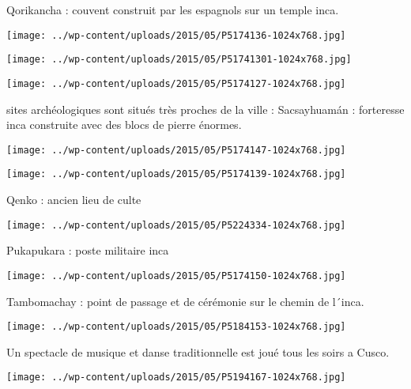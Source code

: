  Qorikancha : couvent construit par les espagnols sur un temple inca. \newline
 \newline
\centerline{\texttt{[image: ../wp-content/uploads/2015/05/P5174136-1024x768.jpg]} } 
 \newline
 \newline
\centerline{\texttt{[image: ../wp-content/uploads/2015/05/P51741301-1024x768.jpg]} } 
 \newline
 \newline
\centerline{\texttt{[image: ../wp-content/uploads/2015/05/P5174127-1024x768.jpg]} } 
  sites archéologiques sont situés très proches de la ville : \newline
 Sacsayhuamán : forteresse inca construite avec des blocs de pierre énormes. \newline
 \newline
\centerline{\texttt{[image: ../wp-content/uploads/2015/05/P5174147-1024x768.jpg]} } 
 \newline
 \newline
\centerline{\texttt{[image: ../wp-content/uploads/2015/05/P5174139-1024x768.jpg]} } 
 \newline
 Qenko : ancien lieu de culte \newline
 \newline
\centerline{\texttt{[image: ../wp-content/uploads/2015/05/P5224334-1024x768.jpg]} } 
 \newline
 Pukapukara : poste militaire inca \newline
 \newline
\centerline{\texttt{[image: ../wp-content/uploads/2015/05/P5174150-1024x768.jpg]} } 
 \newline
 Tambomachay : point de passage et de cérémonie sur le chemin de l´inca. \newline
 \newline
\centerline{\texttt{[image: ../wp-content/uploads/2015/05/P5184153-1024x768.jpg]} } 
 \newline
 Un spectacle de musique et danse traditionnelle est joué tous les soirs a Cusco. \newline
 \newline
\centerline{\texttt{[image: ../wp-content/uploads/2015/05/P5194167-1024x768.jpg]} } 
 \newline
 \newline
